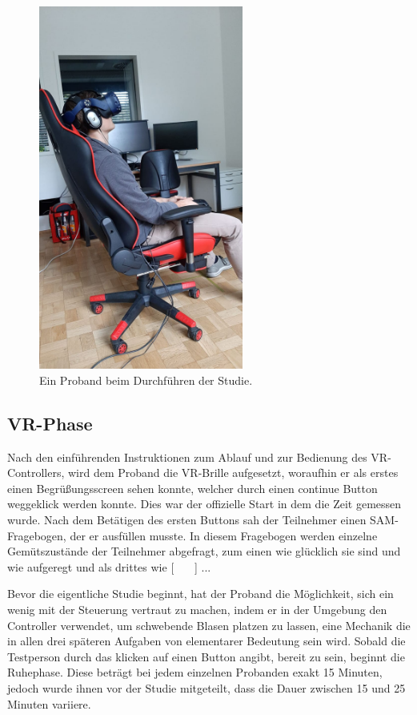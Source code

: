 \begin{figure}[H]
	\centering
	\includegraphics[width=0.6\textwidth]{./images/studie_awf.jpeg}
	\caption{Ein Proband beim Durchführen der Studie.}
	\label{fig:study_setup}
\end{figure}


\subsection{VR-Phase}
Nach den einführenden Instruktionen zum Ablauf und zur Bedienung des VR-Controllers, wird dem Proband die VR-Brille aufgesetzt, woraufhin er als erstes einen Begrüßungsscreen sehen konnte, welcher durch einen continue Button weggeklick werden konnte. Dies war der offizielle Start in dem die Zeit gemessen wurde. Nach dem Betätigen des ersten Buttons sah der Teilnehmer einen SAM-Fragebogen, der er ausfüllen musste. In diesem Fragebogen werden einzelne Gemütszustände der Teilnehmer abgefragt, zum einen wie glücklich sie sind und wie aufgeregt und als drittes wie [ \ \ \ ] ... 

Bevor die eigentliche Studie beginnt, hat der Proband die Möglichkeit, sich ein wenig mit der Steuerung vertraut zu machen, indem er in der Umgebung den Controller verwendet, um schwebende Blasen platzen zu lassen, eine Mechanik die in allen drei späteren Aufgaben von elementarer Bedeutung sein wird. Sobald die Testperson durch das klicken auf einen Button angibt, bereit zu sein, beginnt die Ruhephase. Diese beträgt bei jedem einzelnen Probanden exakt 15 Minuten, jedoch wurde ihnen vor der Studie mitgeteilt, dass die Dauer zwischen 15 und 25 Minuten variiere.

